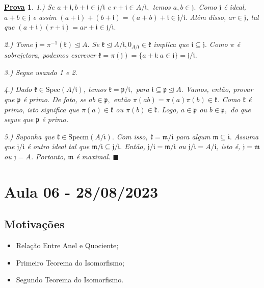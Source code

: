 \documentclass{article}
\newtheorem*{proof*}{\underline{Prova}}
\renewcommand\qedsymbol{$\blacksquare$}
\begin{document}
\begin{proof*}
  1.) Se \(a+\mathfrak{i}, b+\mathfrak{i}\in \mathfrak{j}/\mathfrak{i}\) e \(r+\mathfrak{i}\in A/\mathfrak{i},\) temos
 \(a, b\in \mathfrak{j}.\) Como \(\mathfrak{j}\) é ideal, \(a+b\in \mathfrak{j}\) e assim \((a+\mathfrak{i}) + (b+\mathfrak{i}) = (a+b)
 +\mathfrak{i}\in \mathfrak{j}/\mathfrak{i}.\) Além disso, \(ar\in \mathfrak{j}\), tal que \((a+\mathfrak{i})(r+\mathfrak{i})=ar + \mathfrak{i}\in
 \mathfrak{j}/\mathfrak{i}.\)

 2.) Tome \(\mathfrak{j} = \pi^{-1}(\mathfrak{k})\trianglelefteq{A}.\) Se \(\mathfrak{k}\trianglelefteq{A/\mathfrak{i}}, 0_{A/\mathfrak{i}}\in \mathfrak{k}\)
implica que \(\mathfrak{i}\subseteq{\mathfrak{j}}.\) Como \(\pi \) é sobrejetora, podemos escrever
 \(\mathfrak{k} = \pi(\mathfrak{j}) = \{a+\mathfrak{i}: a\in \mathfrak{j}\} = \mathfrak{j}/\mathfrak{i}.\)

 3.) Segue usando 1 e 2.

 4.) Dado \(\mathfrak{k}\in \mathrm{Spec}(A/\mathfrak{i})\), temos \(\mathfrak{k} = \mathfrak{p}/\mathfrak{i},\)
para \(\mathfrak{i}\subseteq{\mathfrak{p}}\trianglelefteq{A}.\) Vamos, então, provar que \(\mathfrak{p}\) é primo. 
De fato, se \(ab\in \mathfrak{p},\) então \(\pi (ab)=\pi(a)\pi(b)\in \mathfrak{k}\). Como \(\mathfrak{k}\) é primo,
isto significa que \(\pi(a)\in \mathfrak{k}\) ou \(\pi(b)\in \mathfrak{k}\). Logo, \(a\in \mathfrak{p}\) ou \(b\in \mathfrak{p},\) do que
segue que \(\mathfrak{p}\) é primo.

  5.) Suponha que \(\mathfrak{k}\in \mathrm{Specm}(A/\mathfrak{i}).\) Com isso, \(\mathfrak{k} = \mathfrak{m}/\mathfrak{i}\)
para algum \(\mathfrak{m}\subseteq{\mathfrak{i}}.\) Assuma que \(\mathfrak{j}/\mathfrak{i}\) é outro ideal tal que \(\mathfrak{m}/\mathfrak{i}\subseteq{\mathfrak{j}/\mathfrak{i}}.\)
Então, \(\mathfrak{j}/\mathfrak{i} = \mathfrak{m}/\mathfrak{i}\) ou \(\mathfrak{j}/\mathfrak{i} = A/\mathfrak{i}\), isto é,
 \(\mathfrak{j} = \mathfrak{m}\) ou \(\mathfrak{j} = A\). Portanto, \(\mathfrak{m} \) é maximal. \qedsymbol
\end{proof*}
\newpage
 
\section{Aula 06 - 28/08/2023}
\subsection{Motivações}
\begin{itemize}
  \item Relação Entre Anel e Quociente;
  \item Primeiro Teorema do Isomorfismo;
  \item Segundo Teorema do Isomorfismo.
\end{itemize}
\end{document}
